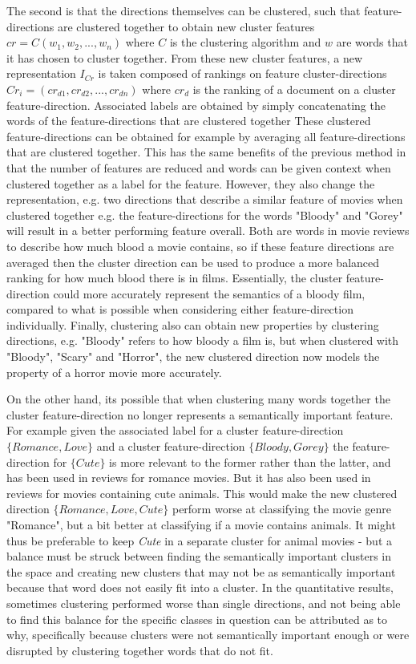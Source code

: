 The second is that the directions themselves can be clustered, such that feature-directions are clustered together to obtain new cluster features ${cr} = C(w_1, w_2, ..., w_n)$ where $C$ is the clustering algorithm and $w$ are words that it has chosen to cluster together. From these new cluster features,  a new representation $I_{Cr}$ is taken composed of rankings on feature cluster-directions  ${Cr_i} = ({cr}_{d1}, {cr}_{d2}, ..., {cr}_{dn})$ where ${cr}_d$ is the ranking of a document on a cluster feature-direction. Associated labels are obtained by simply concatenating the words of the feature-directions that are clustered together These clustered feature-directions can be obtained for example by averaging all feature-directions that are clustered together. This has the same  benefits of the previous method in that the number of features are reduced and words can be given context when clustered together as a label for the feature. However, they also change the representation, e.g. two directions that describe a similar feature of movies when clustered together  e.g. the feature-directions for the words "Bloody" and "Gorey" will result in a better performing feature overall. Both are words in movie reviews to describe how much blood a movie contains, so if these feature directions are averaged then the cluster direction can be used to produce a more balanced ranking for how much blood there is in films.  Essentially, the cluster feature-direction could more accurately represent the semantics of a bloody  film, compared to what is possible when considering either feature-direction individually. Finally, clustering also can obtain new properties by clustering directions, e.g. "Bloody" refers to how bloody a film is, but when clustered with "Bloody", "Scary" and "Horror", the new clustered direction now models the property of a horror movie more accurately.


On the other hand, its possible that when clustering many words together the cluster feature-direction no longer represents a semantically important feature. For example given the associated label for a cluster feature-direction $\{Romance, Love\}$ and a cluster feature-direction $\{Bloody, Gorey\}$ the feature-direction for $\{Cute\}$ is more relevant to the former rather than the latter, and  has been used in reviews for romance movies. But it has also been used in reviews for movies containing cute animals. This would make the new clustered direction $\{Romance, Love, Cute\}$ perform worse at classifying the movie genre "Romance", but a bit better at classifying if a movie contains animals. It might thus be preferable to keep \textit{Cute} in a separate cluster for animal movies - but a balance must be struck between finding the  semantically important clusters in the space and creating new clusters that may not be as semantically important because that word does not easily fit into a cluster. In the quantitative results, sometimes clustering performed worse than single directions, and not being able to find this balance for the specific classes in question can be attributed as to why, specifically because clusters were not semantically important enough or were disrupted by clustering together words that do not fit.

